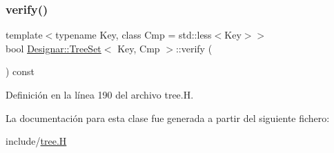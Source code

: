 \subsubsection{\texorpdfstring{verify()}{verify()}}
{\footnotesize\ttfamily template$<$typename Key, class Cmp = std\+::less$<$\+Key$>$$>$ \\
bool \hyperlink{class_designar_1_1_tree_set}{Designar\+::\+Tree\+Set}$<$ Key, Cmp $>$\+::verify (\begin{DoxyParamCaption}{ }\end{DoxyParamCaption}) const\hspace{0.3cm}{\ttfamily [inline]}}



Definición en la línea 190 del archivo tree.\+H.



La documentación para esta clase fue generada a partir del siguiente fichero\+:\begin{DoxyCompactItemize}
\item 
include/\hyperlink{tree_8_h}{tree.\+H}\end{DoxyCompactItemize}
